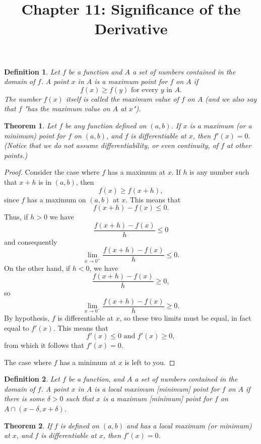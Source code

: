 \documentclass{article}
\newtheorem{definition}{Definition}
\newtheorem{theorem}{Theorem}
\begin{document}
\title{Chapter 11: Significance of the Derivative}
\maketitle

\begin{definition}
  Let $f$ be a function and $A$ a set of numbers contained in the domain of
  $f$. A point $x$ in $A$ is a \emph{maximum point} for $f$ on $A$ if \[
    f(x) \geq f(y) \text{ for every } y \text{ in } A.
  \] The number $f(x)$ itself is called the \emph{maximum value} of $f$ on $A$
  (and we also say that $f$ "has the maximum value on $A$ at $x$").
\end{definition}

\begin{theorem}
  Let $f$ be any function defined on $(a, b)$. If $x$ is a maximum (or a
  minimum) point for $f$ on $(a, b)$, and $f$ is differentiable at $x$, then
  $f'(x) = 0$. (Notice that we do not assume differentiability, or even
  continuity, of $f$ at other points.)
\end{theorem}
\begin{proof}
  Consider the case where $f$ has a maximum at $x$. If $h$ is any number such
  that $x + h$ is in $(a, b)$, then \[
    f(x) \geq f(x + h),
  \] since $f$ has a maximum on $(a, b)$ at $x$. This means that \[
    f(x + h) - f(x) \leq 0.
  \] Thus, if $h > 0$ we have \[
    \frac{f(x + h) - f(x)}{h} \leq 0
  \] and consequently \[
    \lim_{x \to 0^+} \frac{f(x + h) - f(x)}{h} \leq 0.
  \] On the other hand, if $h < 0$, we have \[
    \frac{f(x + h) - f(x)}{h} \geq 0,
  \] so \[
    \lim_{x \to 0^-} \frac{f(x + h) - f(x)}{h} \geq 0.
  \] By hypothesis, $f$ is differentiable at $x$, so these two limits must be
  equal, in fact equal to $f'(x)$. This means that \[
    f'(x) \leq 0 \text{ and } f'(x) \geq 0,
  \] from which it follows that $f'(x) = 0$.

  The case where $f$ has a minimum at $x$ is left to you.
\end{proof}

\begin{definition}
  Let $f$ be a function, and $A$ a set of numbers contained in the domain of
  $f$. A point $x$ in $A$ is a \emph{local maximum [minimum] point} for $f$ on
  $A$ if there is some $\delta > 0$ such that $x$ is a \emph{maximum [minimum]
  point} for $f$ on $A \cap (x - \delta, x + \delta)$.
\end{definition}

\begin{theorem}
  If $f$ is defined on $(a, b)$ and has a local maximum (or minimum) at $x$,
  and $f$ is differentiable at $x$, then $f'(x) = 0$.
\end{theorem}
\end{document}
